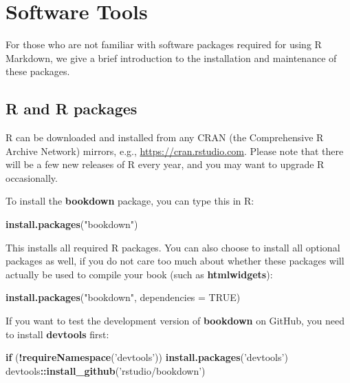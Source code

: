 \documentclass[
  12pt,
]{krantz}
\makeatletter
\newenvironment{Shaded}{\begin{snugshade}}{\end{snugshade}}
\newcommand{\ControlFlowTok}[1]{\textcolor[rgb]{0.13,0.29,0.53}{\textbf{#1}}}
\newcommand{\DataTypeTok}[1]{\textcolor[rgb]{0.13,0.29,0.53}{#1}}
\newcommand{\KeywordTok}[1]{\textcolor[rgb]{0.13,0.29,0.53}{\textbf{#1}}}
\newcommand{\NormalTok}[1]{#1}
\newcommand{\OperatorTok}[1]{\textcolor[rgb]{0.81,0.36,0.00}{\textbf{#1}}}
\newcommand{\OtherTok}[1]{\textcolor[rgb]{0.56,0.35,0.01}{#1}}
\newcommand{\StringTok}[1]{\textcolor[rgb]{0.31,0.60,0.02}{#1}}
\newenvironment{kframe}{%
\medskip{}
\setlength{\fboxsep}{.8em}
 \def\at@end@of@kframe{}%
 \ifinner\ifhmode%
  \def\at@end@of@kframe{\end{minipage}}%
  \begin{minipage}{\columnwidth}%
 \fi\fi%
 \def\FrameCommand##1{\hskip\@totalleftmargin \hskip-\fboxsep
 \colorbox{shadecolor}{##1}\hskip-\fboxsep
     \hskip-\linewidth \hskip-\@totalleftmargin \hskip\columnwidth}%
 \MakeFramed {\advance\hsize-\width
   \@totalleftmargin\z@ \linewidth\hsize
   \@setminipage}}%
 {\par\unskip\endMakeFramed%
 \at@end@of@kframe}
\renewenvironment{Shaded}{\begin{kframe}}{\end{kframe}}
\makeatother
\begin{document}
\cleardoublepage

\hypertarget{appendix-apendice}{%
\appendix {}}


\hypertarget{software-tools}{%
\chapter{Software Tools}\label{software-tools}}

For those who are not familiar with software packages required for using R Markdown, we give a brief introduction to the installation and maintenance of these packages.

\hypertarget{r-and-r-packages}{%
\section{R and R packages}\label{r-and-r-packages}}

R can be downloaded and installed from any CRAN (the Comprehensive R Archive Network) mirrors, e.g., \url{https://cran.rstudio.com}. Please note that there will be a few new releases of R every year, and you may want to upgrade R occasionally.

To install the \textbf{bookdown} package, you can type this in R:

\begin{Shaded}
\begin{Highlighting}[]
\KeywordTok{install.packages}\NormalTok{(}\StringTok{"bookdown"}\NormalTok{)}
\end{Highlighting}
\end{Shaded}

This installs all required R packages. You can also choose to install all optional packages as well, if you do not care too much about whether these packages will actually be used to compile your book (such as \textbf{htmlwidgets}):

\begin{Shaded}
\begin{Highlighting}[]
\KeywordTok{install.packages}\NormalTok{(}\StringTok{"bookdown"}\NormalTok{, }\DataTypeTok{dependencies =} \OtherTok{TRUE}\NormalTok{)}
\end{Highlighting}
\end{Shaded}

If you want to test the development version of \textbf{bookdown} on GitHub, you need to install \textbf{devtools} first:

\begin{Shaded}
\begin{Highlighting}[]
\ControlFlowTok{if}\NormalTok{ (}\OperatorTok{!}\KeywordTok{requireNamespace}\NormalTok{(}\StringTok{'devtools'}\NormalTok{)) }\KeywordTok{install.packages}\NormalTok{(}\StringTok{'devtools'}\NormalTok{)}
\NormalTok{devtools}\OperatorTok{::}\KeywordTok{install_github}\NormalTok{(}\StringTok{'rstudio/bookdown'}\NormalTok{)}
\end{Highlighting}
\end{Shaded}
\end{document}
